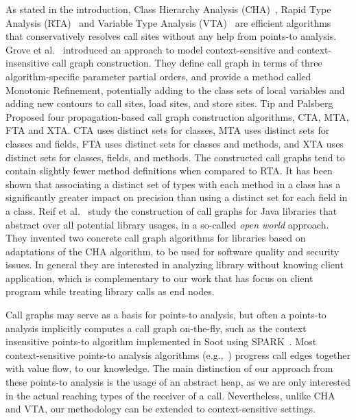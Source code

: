 \documentclass{llncs}
\begin{document}
As stated in the introduction, Class Hierarchy Analysis (CHA)~\cite{Dean1995,Fernandez1995}, Rapid Type Analysis (RTA)~\cite{Bacon1996} and Variable Type Analysis (VTA)~\cite{Sundaresan2000} are efficient algorithms that conservatively resolves call sites without any help from points-to analysis. Grove et al.~\cite{Grove1997} introduced an approach to model context-sensitive and context-insensitive call graph construction. They define call graph in terms of three algorithm-specific parameter partial orders, and provide a method called Monotonic Refinement, potentially adding to the class sets of local variables and adding new contours to call sites, load sites, and store sites. Tip and Palsberg~\cite{Tip2000} Proposed four propagation-based call graph construction algorithms, CTA, MTA, FTA and XTA. CTA uses distinct sets for classes, MTA uses distinct sets for classes and fields, FTA uses distinct sets for classes and methods, and XTA uses distinct
sets for classes, fields, and methods. The constructed call graphs tend to contain slightly fewer method definitions when compared to RTA. It has been shown that associating a distinct set of types with each method in a class has a significantly greater impact on precision than using a distinct set for each field in a class. Reif et al.~\cite{Reif2016} study the construction of call graphs for Java libraries that abstract over all potential library usages, in a so-called \emph{open world} approach. They invented two concrete call graph algorithms for libraries based on adaptations of the CHA algorithm, to be used for software quality and security issues. In general they are interested in analyzing library without knowing client application, which is complementary to our work that has focus on client program while treating library calls as end nodes.

Call graphs may serve as a basis for points-to analysis, but often a points-to analysis implicitly computes a call graph on-the-fly, such as the context insensitive points-to algorithm implemented in Soot using SPARK~\cite{Lhotak2003}. Most context-sensitive points-to analysis algorithms (e.g.,~\cite{Milanova2005,Sridharan2006,Smaragdakis11,Tan16}) progress call edges together with value flow, to our knowledge. The main distinction of our approach from these points-to analysis is the usage of an abstract heap, as we are only interested in the actual reaching types of the receiver of a call. Nevertheless, unlike CHA and VTA, our methodology can be extended to context-sensitive settings.
\end{document}
